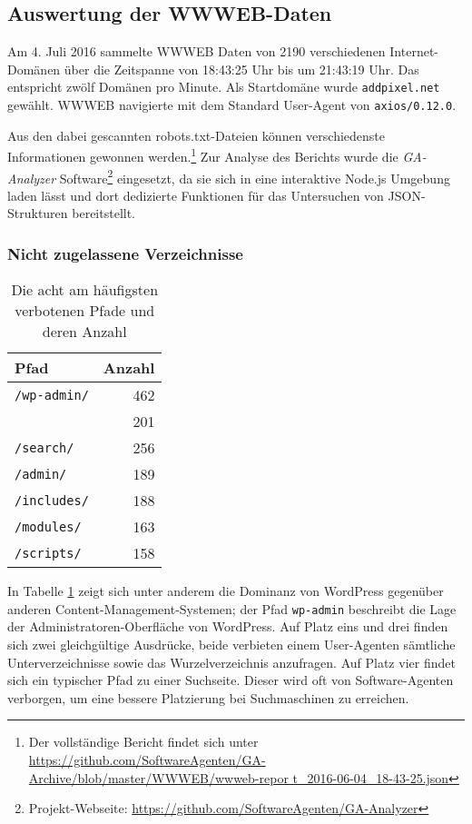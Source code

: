\subsection{Auswertung der WWWEB-Daten}
\label{sub:auswertung-der-wwweb-daten}

Am 4. Juli 2016 sammelte WWWEB Daten von 2190 verschiedenen Internet-Domänen
über die Zeitspanne von 18:43:25 Uhr bis um 21:43:19 Uhr. Das entspricht zwölf
Domänen pro Minute. Als Startdomäne wurde \texttt{addpixel.net} gewählt. WWWEB
navigierte mit dem Standard User-Agent von \texttt{axios/0.12.0}.

Aus den dabei gescannten robots.txt-Dateien können verschiedenste Informationen
gewonnen werden.\footnote{Der vollständige Bericht findet sich unter
\url{https://github.com/SoftwareAgenten/GA-Archive/blob/master/WWWEB/wwweb-repor
t_2016-06-04_18-43-25.json}} Zur Analyse des Berichts wurde die
\emph{GA-Analyzer} Software\footnote{Projekt-Webseite:
\url{https://github.com/SoftwareAgenten/GA-Analyzer}} eingesetzt, da sie sich
in eine interaktive Node.js Umgebung laden lässt und dort dedizierte Funktionen
für das Untersuchen von JSON-Strukturen bereitstellt.

\subsubsection{Nicht zugelassene Verzeichnisse}
\label{ssub:nicht-zugelassene-verzeichnisse}

\begin{table}[h]
  \begin{tabular}{ l|r }
    \textbf{Pfad} & \textbf{Anzahl}\\
    \hline
    \texttt{/wp-admin/} & 462 \\
                        & 201 \\
    \texttt{/search/}   & 256 \\
    \texttt{/admin/}    & 189 \\
    \texttt{/includes/} & 188 \\
    \texttt{/modules/}  & 163 \\
    \texttt{/scripts/}  & 158 \\
  \end{tabular}
  
  \caption{Die acht am häufigsten verbotenen Pfade und deren Anzahl}
  \label{tab:maxBlockedDirs}
\end{table}

In Tabelle \ref{tab:maxBlockedDirs} zeigt sich unter anderem die Dominanz von
WordPress gegenüber anderen Content-Management-Systemen; der Pfad
\texttt{wp-admin} beschreibt die Lage der Administratoren-Oberfläche von
WordPress. Auf Platz eins und drei finden sich zwei gleichgültige Ausdrücke,
beide verbieten einem User-Agenten sämtliche Unterverzeichnisse sowie das
Wurzelverzeichnis anzufragen. Auf Platz vier findet sich ein typischer Pfad zu
einer Suchseite. Dieser wird oft von Software-Agenten verborgen, um eine
bessere Platzierung bei Suchmaschinen zu erreichen.

